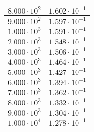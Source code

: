 \begin{tabular}{|c|c|}
    \(8.000\cdot10^2\) & \(1.602\cdot10^{-1}\) \\ \hline    
    \(9.000\cdot10^2\) & \(1.597\cdot10^{-1}\) \\ \hline    
    \(1.000\cdot10^3\) & \(1.591\cdot10^{-1}\) \\ \hline    
    \(2.000\cdot10^3\) & \(1.548\cdot10^{-1}\) \\ \hline    
    \(3.000\cdot10^3\) & \(1.506\cdot10^{-1}\) \\ \hline    
    \(4.000\cdot10^3\) & \(1.464\cdot10^{-1}\) \\ \hline    
    \(5.000\cdot10^3\) & \(1.427\cdot10^{-1}\) \\ \hline    
    \(6.000\cdot10^3\) & \(1.394\cdot10^{-1}\) \\ \hline    
    \(7.000\cdot10^3\) & \(1.362\cdot10^{-1}\) \\ \hline    
    \(8.000\cdot10^3\) & \(1.332\cdot10^{-1}\) \\ \hline    
    \(9.000\cdot10^3\) & \(1.304\cdot10^{-1}\) \\ \hline    
    \(1.000\cdot10^4\) & \(1.278\cdot10^{-1}\) \\ \hline
\end{tabular}